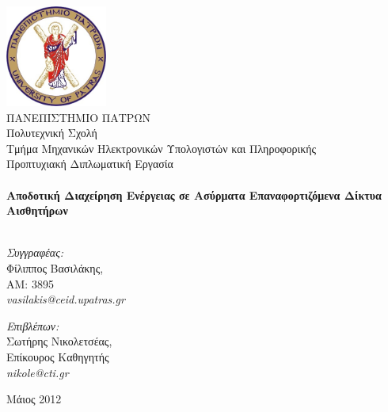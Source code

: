 
\begin{titlingpage}
\begin{center}

\includegraphics[width=0.25\textwidth]{images/upatras_logo.jpg}\\[1cm]

\HUGE 	ΠΑΝΕΠΙΣΤΗΜΙΟ ΠΑΤΡΩΝ\\
\LARGE	Πολυτεχνική Σχολή\\
\Huge	Τμήμα Μηχανικών Ηλεκτρονικών Υπολογιστών και Πληροφορικής\\[1.5cm]

\LARGE Προπτυχιακή Διπλωματική Εργασία\\[0.1cm]


\HRule \\[0.4cm]
{ \HUGE \bfseries Αποδοτική Διαχείρηση Ενέργειας σε Ασύρματα Επαναφορτιζόμενα Δίκτυα Αισθητήρων}\\[0.4cm]

\HRule \\[0.5cm]

\begin{minipage}{0.4\textwidth}
\begin{flushleft} \large
\textit{Συγγραφέας:}\\
Φίλιππος Βασιλάκης, \\AM: 3895\\ \textit{vasilakis@ceid.upatras.gr}
\end{flushleft}
\end{minipage}
\begin{minipage}{0.4\textwidth}
\begin{flushright} \large
\textit{Επιβλέπων:} \\
Σωτήρης Νικολετσέας, \\Επίκουρος Καθηγητής\\ \textit{nikole@cti.gr}
\end{flushright}
\end{minipage}

\vfill

{\large Μάιος 2012}

\end{center}

\end{titlingpage}
